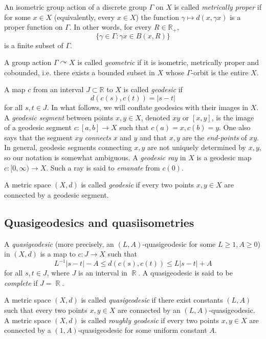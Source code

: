 \documentclass[12pt]{amsbook}%
\theoremstyle{definition}
\theoremstyle{remark}
\numberwithin{section}{chapter}
\numberwithin{subsection}{section}
\numberwithin{figure}{chapter}
\DeclareMathOperator{\acts}{\curvearrowright}
\DeclareMathOperator{\R}{\mathbb{R}}
\def\Ga{\Gamma}
\def\ga{\gamma}
\begin{document}
An isometric group action of a discrete group $\Ga$ on $X$ is called {\em metrically proper}  
if for some $x\in X$ (equivalently, every $x\in X$) 
the function $\gamma\mapsto d(x, \gamma x)$ is a proper function on $\Ga$. In other words, for every $R\in \mathbb R_+$,
$$
\{\ga\in \Ga: \ga x \in B(x,R)\}
$$
is a finite subset of $\Ga$.  

A group action $\Gamma\acts X$ is called {\em geometric} if it is isometric, metrically proper and cobounded, i.e. there exists a bounded subset in $X$ whose $\Ga$-orbit is the entire $X$.   

A map $c$ from an interval $J\subset {\mathbb R}$ to $X$ is called {\em geodesic} if  
$$
d(c(s), c(t))=|s-t|
$$
for all $s, t\in J$. In what follows, we will conflate geodesics with their images in $X$. A {\em geodesic segment}  
between points $x, y\in X$, denoted $xy$ or $[x,y]$, is the image of a geodesic segment $c: [a,b]\to X$ such that $c(a)=x, c(b)=y$. One also says that the segment $xy$ {\em connects} $x$ and $y$ and that $x, y$ are the {\em end-points} of $xy$.  In general, geodesic segments connecting $x, y$ are not uniquely determined by $x, y$, so our notation is somewhat ambiguous. A {\em geodesic ray} in $X$ is a geodesic map 
$c: [0,\infty)\to X$. Such a ray is said to {\em emanate} from $c(0)$.  


A metric space $(X,d)$ is called {\em geodesic}  
if  every two points $x, y\in X$ are connected by a geodesic segment. 

\subsection{Quasigeodesics and quasiisometries} 
\label{sec:quasigeod_quasiiso}

A {\em quasigeodesic} (more precisely, an $(L,A)$-quasigeodesic for some $L\geqslant 1, A\geqslant 0$)  
in $(X,d)$ is a map to $c: J\to X$ such that 
$$
 L^{-1}|s-t| -A\leqslant d(c(s), c(t))\leqslant L|s-t| +A 
$$
for all $s, t\in J$, where $J$ is an interval in $\R$. A quasigeodesic is said to be {\em complete} if $J=\R$.  

A metric space 
$(X,d)$ is called {\em quasigeodesic} if there exist constants $(L,A)$ such that every two points $x, y\in X$ are connected by an  
$(L,A)$-quasigeodesic. A metric space $(X,d)$ is called {\em roughly geodesic} if every two points $x, y\in X$ are connected by a   $(1,A)$-quasigeodesic for some uniform constant $A$. 
\end{document}
